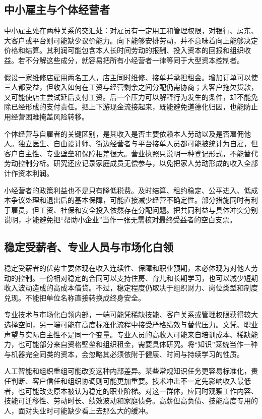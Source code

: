 \documentclass[UTF8,fontset=fandol,zihao=-4,oneside,openany]{ctexbook}
\begin{document}
\subsection{中小雇主与个体经营者}
中小雇主处在两种关系的交汇处：对雇员有一定用工和管理权限，对银行、房东、大客户或平台则可能缺少议价能力。向下能够安排劳动，并不意味着向上能够决定价格和结算。其利润可能包含本人长时间劳动的报酬、投入资本的回报和组织收益。若不分解这些成分，就容易把所有小经营者一律等同于大型资本控制者。

假设一家维修店雇用两名工人，店主同时维修、接单并承担租金。增加订单可以使三人都受益，但收入如何在工资与经营剩余之间分配仍需协商；大客户拖欠货款，又可能使店主尝试延后支付工资。后一个压力可以解释行为发生的条件，却不能免除已经形成的支付责任。把上下游现金流接起来，既能避免道德化归因，也能防止用经营困难掩盖风险转移。

个体经营与自雇者的关键区别，是其收入是否主要依赖本人劳动以及是否雇佣他人。独立医生、自由设计师、街边经营者与平台接单人员都可能被统计为自雇，但客户自主性、专业壁垒和保障相差很大。营业执照只说明一种登记形式，不能替代劳动控制分析。研究还应记录家庭成员无偿参与，以免把家人劳动形成的收入全部计作资本利润。

小经营者的政策利益也不是只有降低税费。及时结算、租约稳定、公平进入、低成本争议处理和退出后的基本保障，可能直接减少经营不确定性。部分措施同时有利于雇员，但工资、社保和安全投入依然存在分配问题。把共同利益与具体冲突分别说明，才能避免把“帮助小企业”当作一张无需核对最终受益者的空白支票。

\subsection{稳定受薪者、专业人员与市场化白领}
稳定受薪者的优势主要体现在收入连续性、保障和职业预期，未必体现为对他人劳动的控制。一份相对稳定的合同可以支持住房、育儿和长期学习，也可以减少短期收入波动造成的高成本借贷。不过，稳定程度仍取决于组织财力、岗位类型和制度兑现。不能把单位名称直接转换成终身安全。

专业技术与市场化白领内部，一端可能凭稀缺技能、客户关系或管理权限获得较大选择空间，另一端可能在高度标准化流程中接受严格绩效与替代压力。文凭、职业声望与实际自主性不是同一个变量。专业人员的高收入可能来自培训成本、稀缺能力，也可能部分来自资格壁垒和组织租金，需要具体研究。将“知识”笼统当作一种与机器完全同类的资本，会忽略其必须依附于健康、时间与持续学习的性质。

人工智能和组织重组可能改变这种内部差异。某些常规知识任务更容易标准化，责任判断、客户信任和组织协调则可能更加重要。技术冲击不一定先影响收入最低者，也可能改变原本被认为稳定的职业阶梯。对这一群体，应同时观察工作内容、技能可迁移性、劳动时长、绩效波动和家庭债务。高薪但高负债、技能高度专用的人，面对失业时可能缺少看上去那么大的缓冲。
\end{document}
